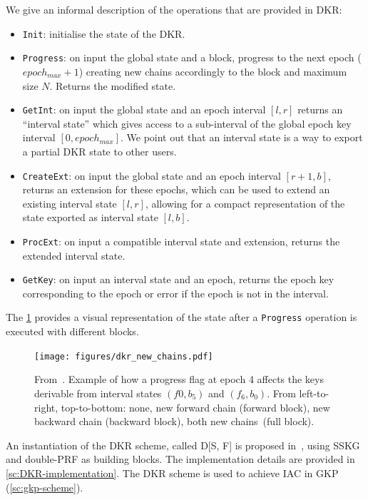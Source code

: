 We give an informal description of the operations that are provided in DKR:
\begin{itemize}
    \item \texttt{Init}: initialise the state of the DKR.
    \item \texttt{Progress}: on input the global state and a block, progress to the next epoch ($epoch_{max} + 1$) creating new chains accordingly to the block and maximum size $N$. Returns the modified state.
    \item \texttt{GetInt}: on input the global state and an epoch interval $[l, r]$ returns an ``interval state'' which gives access to a sub-interval of the global epoch key interval $[0, epoch_{max}]$. We point out that an interval state is a way to export a partial DKR state to other users.
    \item \texttt{CreateExt}: on input the global state and an epoch interval $[r + 1, b]$, returns
    an extension for these epochs, which can be used to extend an existing interval state $[l, r]$, allowing for a compact representation of the state exported as interval state $[l, b]$.
    \item \texttt{ProcExt}: on input a compatible interval state and extension, returns the
    extended interval state.
    \item \texttt{GetKey}: on input an interval state and an epoch, returns the epoch key corresponding to the epoch or error if the epoch is not in the interval.
\end{itemize}

The \cref{fig:dkr-new-chains} provides a visual representation of the 
state after a \texttt{Progress} operation is executed with different blocks.

\begin{figure}[t]
	\centering
	\texttt{[image: figures/dkr\_new\_chains.pdf]}
	\caption{
        From~\cite{GKP}.
		Example of how a progress flag at epoch 4 affects the keys derivable from interval states $(f{0}, b_{5})$ and $(f_{6}, b_{0})$.
		From left-to-right, top-to-bottom: none, new forward chain (forward block), new backward chain (backward block), both new chains~(full block). 
        \label{fig:dkr-new-chains}}
\end{figure}

An instantiation of the DKR scheme, called D[S, F] is proposed in~\cite{GKP},
using SSKG and double-PRF as building blocks. The implementation
details are provided in \cref{sc:DKR-implementation}.
The DKR scheme is used to achieve IAC in GKP (\cref{sc:gkp-scheme}).


